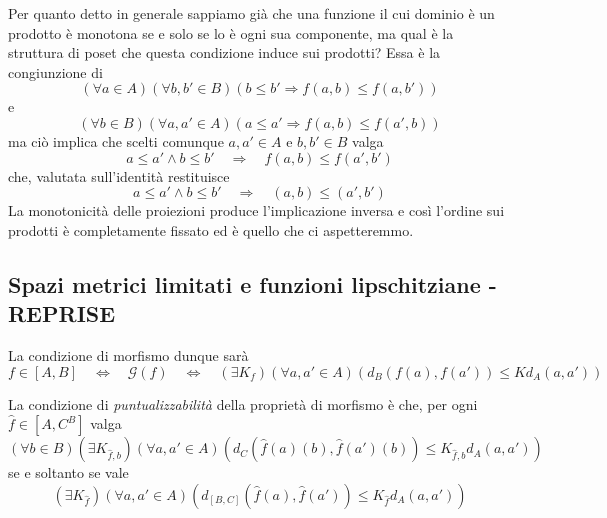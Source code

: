Per quanto detto in generale sappiamo già che una funzione il cui dominio è un prodotto è monotona se e solo se lo è ogni sua componente, ma qual è la struttura di poset che questa condizione induce sui prodotti? Essa è la congiunzione di
\[
(\forall a \in A)(\forall b,b' \in B)(b \leq b' \Rightarrow f(a,b) \leq f(a,b'))
\]
e
\[
(\forall b \in B)(\forall a,a' \in A)(a \leq a' \Rightarrow f(a,b) \leq f(a',b))
\]
ma ciò implica che scelti comunque $a,a' \in A$ e $b,b' \in B$ valga
\[
a \leq a' \wedge b \leq b'
\quad\Rightarrow\quad
f(a,b) \leq f(a',b')
\]
che, valutata sull'identità restituisce
\[
a \leq a' \wedge b \leq b'
\quad\Rightarrow\quad
(a,b) \leq (a',b')
\]
La monotonicità delle proiezioni produce l'implicazione inversa e così l'ordine sui prodotti è completamente fissato ed è quello che ci aspetteremmo.




\subsection*{Spazi metrici limitati e funzioni lipschitziane - REPRISE}

La condizione di morfismo dunque sarà
\[
f \in [A,B]
\quad\Leftrightarrow\quad
{\mathcal G}(f)
\quad\Leftrightarrow\quad
(\exists K_f)(\forall a,a' \in A)(d_B(f(a),f(a')) \leq K d_A(a,a'))
\]

La condizione di {\it puntualizzabilità}  della proprietà di morfismo è che, per ogni $\hat{f}\in\left[A,C^B\right]$ valga
\[
(\forall b \in B)
(\exists K_{\hat{f},b})
(\forall a,a' \in A)
(d_C(\hat{f}(a)(b),\hat{f}(a')(b)) \leq K_{\hat{f},b} d_A(a,a'))
\]
se e soltanto se vale
\[
(\exists K_{\hat{f}})
(\forall a,a' \in A)
(d_{\left[B,C\right]}(\hat{f}(a),\hat{f}(a')) \leq K_{\hat{f}} d_A(a,a'))
\]

\hypertarget{p2c-lipshitz}{}


